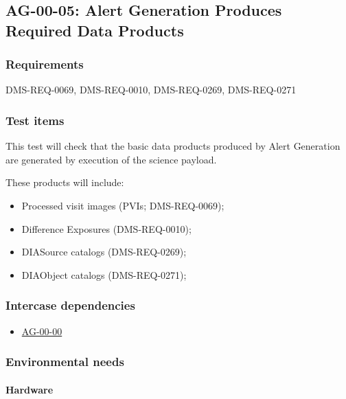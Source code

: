 \subsection{AG-00-05: Alert Generation Produces Required Data Products}
\label{ag-00-05}

\subsubsection{Requirements}

DMS-REQ-0069, DMS-REQ-0010, DMS-REQ-0269, DMS-REQ-0271

\subsubsection{Test items}
\label{ag-00-05-items}

This test will check that the basic data products produced by Alert
Generation are generated by execution of the science payload.

These products will include:

\begin{itemize}

  \item{Processed visit images (PVIs; DMS-REQ-0069);}
  \item{Difference Exposures (DMS-REQ-0010);}
  \item{DIASource catalogs (DMS-REQ-0269);}
  \item{DIAObject catalogs (DMS-REQ-0271);}

\end{itemize}

\subsubsection{Intercase dependencies}

\begin{itemize}

  \item{\hyperref[ag-00-00]{AG-00-00}}

\end{itemize}

\subsubsection{Environmental needs}

\paragraph{Hardware}

